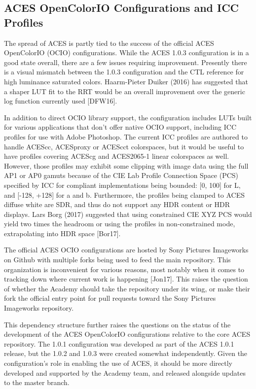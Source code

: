 \documentclass[conference]{IEEEtran}
\begin{document}
\subsection{ACES OpenColorIO Configurations and ICC Profiles}
The spread of ACES is partly tied to the success of the official ACES OpenColorIO (OCIO) configurations. While the ACES 1.0.3 configuration is in a good state overall, there are a few issues requiring improvement. Presently there is a visual mismatch between the 1.0.3 configuration and the CTL reference for high luminance saturated colors. Haarm-Pieter Duiker (2016) has suggested that a shaper LUT fit to the RRT would be an overall improvement over the generic log function currently used [DFW16].

In addition to direct OCIO library support, the configuration includes LUTs built for various applications that don’t offer native OCIO support, including ICC profiles for use with Adobe Photoshop. The current ICC profiles are authored to handle ACEScc, ACESproxy or ACEScct colorspaces, but it would be useful to have profiles covering ACEScg and ACES2065-1 linear colorspaces as well. However, those profiles may exhibit some clipping with image data using the full AP1 or AP0 gamuts because of the CIE Lab Profile Connection Space (PCS) specified by ICC for compliant implementations being bounded: [0, 100] for L, and [-128, +128] for a and b. Furthermore, the profiles being clamped to ACES diffuse white are SDR, and thus do not support any HDR content or HDR displays. Lars Borg (2017) suggested that using constrained CIE XYZ PCS would yield two times the headroom or using the profiles in non-constrained mode, extrapolating into HDR space [Bor17].

The official ACES OCIO configurations are hosted by Sony Pictures Imageworks on Github with multiple forks being used to feed the main repository. This organization is inconvenient for various reasons, most notably when it comes to tracking down where current work is happening [Jon17]. This raises the question of whether the Academy should take the repository under its wing, or make their fork the official entry point for pull requests toward the Sony Pictures Imageworks repository.

This dependency structure further raises the questions on the status of the development of the ACES OpenColorIO configurations relative to the core ACES repository. The 1.0.1 configuration was developed as part of the ACES 1.0.1 release, but the 1.0.2 and 1.0.3 were created somewhat independently. Given the configuration's role in enabling the use of ACES, it should be more directly developed and supported by the Academy team, and released alongside updates to the master branch.
\end{document}
